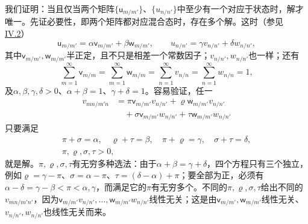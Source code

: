 \documentclass[fontsize=13pt,twoside,openany,headings=normal,parskip=false,bookmarkpackage=false,DIV=calc]{scrbook}
\begin{document}
我们证明：当且仅当两个矩阵$\{\mathsf u_{m/m'}\}$、$\{u_{n/n'}\}$中至少有一个对应于状态时，解才唯一。先证必要性，即两个矩阵都对应混合态时，存在多个解。这时（参见 \hyperref[sec:IV.2]{IV.2}）
\[
 \mathsf u_{m/m'}=\alpha \mathsf v_{m/m'}+\beta \mathsf w_{m/m'},\qquad
 u_{n/n'}=\gamma v_{n/n'}+\delta w_{n/n'},
\]
其中$\mathsf v_{m/m'},\allowbreak \mathsf w_{m/m'}$半正定，且不只是相差一个常数因子；$v_{n/n'},\allowbreak w_{n/n'}$也一样；还有
\[
 \sum_{m=1}^{\infty}\mathsf v_{m/m}=\sum_{m=1}^{\infty}\mathsf w_{m/m}
 =\sum_{n=1}^{\infty}v_{n/n}=\sum_{n=1}^{\infty}w_{n/n}=1,
\]
及$\alpha,\allowbreak \beta,\allowbreak \gamma,\allowbreak \delta>0$、$\alpha+\beta=1$、$\gamma+\delta=1$。容易验证，任一
\begin{align*}
 v_{mn/m'n}&=\pi \mathsf v_{m/m'}v_{n/n'}+\varrho \mathsf w_{m/m'}v_{n/n'}\\
 &\quad+\sigma \mathsf v_{m/m'}w_{n/n'}+\tau \mathsf w_{m/m'}w_{n/n'}
\end{align*}\hypertarget{origpage-228}{}\label{origpage-228}只要满足
\begin{gather*}
 \pi+\sigma=\alpha,\quad\varrho+\tau=\beta,\quad
 \pi+\varrho=\gamma,\quad\sigma+\tau=\delta,\\
 \pi,\varrho,\sigma,\tau>0,
\end{gather*}
就是解。$\pi,\allowbreak \varrho,\allowbreak \sigma,\allowbreak \tau$有无穷多种选法：由于$\alpha+\beta=\gamma+\delta$，四个方程只有三个独立，例如$\varrho=\gamma-\pi$、$\sigma=\alpha-\pi$、$\tau=(\delta-\alpha)+\pi$；要全部为正，必须有$\alpha-\delta=\gamma-\beta<\pi<\alpha,\allowbreak \gamma$，而满足它的$\pi$有无穷多个。不同的$\pi,\allowbreak \varrho,\allowbreak \sigma,\allowbreak \tau$给出不同的$v_{mn/m'n'}$，因为$\mathsf v_{m/m'}v_{n/n'},\allowbreak \ldots,\allowbreak \mathsf w_{m/m'}w_{n/n'}$线性无关；这是由$\mathsf v_{m/m'},\allowbreak \mathsf w_{m/m'}$线性无关、$v_{n/n'},\allowbreak w_{n/n'}$也线性无关而来。
\end{document}
